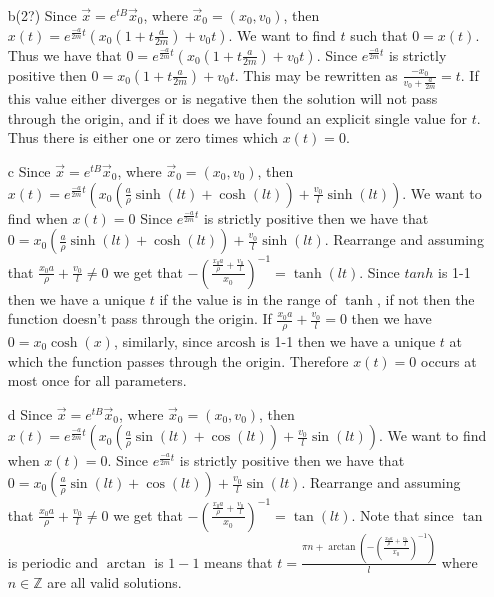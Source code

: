 \documentclass[12pt, letterpaper]{article}
\newcommand{\Z}{\mathbb{Z}}
\begin{document}
\begin{enumerate}
\begin{enumerate}
		\item[b(2?)]
			Since $\Vec{x} = e^{tB}\Vec{x}_0$, where $\Vec{x}_0 = (x_0,v_0)$, then $x(t) = e^{\frac{-a}{2m}t}(x_0(1+t\frac{a}{2m}) + v_0 t)$.  We want to find $t$ such that $0 = x(t)$.  Thus we have that $0 = e^{\frac{-a}{2m}t}(x_0(1+t\frac{a}{2m}) + v_0 t)$.  Since $e^{\frac{-a}{2m}t}$ is strictly positive then $0 = x_0(1+t\frac{a}{2m}) + v_0 t$.  This may be rewritten as $ \frac{-x_0}{v_0 + \frac{a}{2m}} = t$.  If this value either diverges or is negative then the solution will not pass through the origin, and if it does we have found an explicit single value for $t$.  Thus there is either one or zero times which $x(t) = 0$.  
		\item[c] Since $\Vec{x} = e^{tB}\Vec{x}_0$, where $\Vec{x}_0 = (x_0,v_0)$, then $x(t) = e^{\frac{-a}{2m}t}(x_0 ( \frac{a}{\rho} \sinh(lt) + \cosh(lt)) + \frac{v_0}{l} \sinh(lt))$.  We want to find when $x(t) = 0$  Since $e^{\frac{-a}{2m}t}$ is strictly positive then we have that $ 0=x_0 ( \frac{a}{\rho} \sinh(lt) + \cosh(lt)) + \frac{v_0}{l} \sinh(lt)$.  Rearrange and assuming that $\frac{x_0 a}{\rho} + \frac{v_0}{l} \neq 0$ we get that $ -(\frac{\frac{x_0 a}{\rho} + \frac{v_0}{l}}{x_0})^{-1} = \tanh(lt)$.  Since $tanh$ is 1-1 then we have a unique $t$ if the value is in the range of $\tanh$, if not then the function doesn't pass through the origin.  If $\frac{x_0 a}{\rho} + \frac{v_0}{l} = 0$ then we have $0= x_0 \cosh(x)$, similarly, since $\text{arcosh}$ is 1-1 then we have a unique $t$ at which the function passes through the origin.  Therefore $x(t) = 0$ occurs at most once for all parameters.  
		\item[d] Since $\Vec{x} = e^{tB}\Vec{x}_0$, where $\Vec{x}_0 = (x_0,v_0)$, then $x(t) = e^{\frac{-a}{2m}t}(x_0 ( \frac{a}{\rho} \sin(lt) + \cos(lt)) + \frac{v_0}{l} \sin(lt))$. We want to find when $x(t) = 0$.  Since $e^{\frac{-a}{2m}t}$ is strictly positive then we have that $ 0=x_0 ( \frac{a}{\rho} \sin(lt) + \cos(lt)) + \frac{v_0}{l} \sin(lt)$.  Rearrange and assuming that $\frac{x_0 a}{\rho} + \frac{v_0}{l} \neq 0$ we get that $ -(\frac{\frac{x_0 a}{\rho} + \frac{v_0}{l}}{x_0})^{-1} = \tan(lt)$.  Note that since $\tan$ is periodic and $\arctan$ is $1-1$ means that $t = \frac{\pi n + \arctan(-(\frac{\frac{x_0 a}{\rho} + \frac{v_0}{l}}{x_0})^{-1})}{l}$ where $n \in \Z$ are all valid solutions.   
		
	\end{enumerate}
\end{enumerate}
\end{document}
